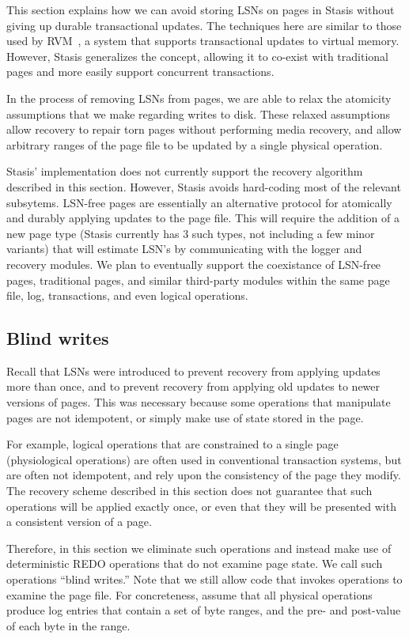 \documentclass[letterpaper,twocolumn,10pt]{article}
\newcommand{\yad}{Stasis\xspace}
\newcommand{\yads}{Stasis'\xspace}
\begin{document}
This section explains how we can avoid storing LSNs on pages in \yad
without giving up durable transactional updates.  The techniques here
are similar to those used by RVM~\cite{lrvm}, a system that supports
transactional updates to virtual memory.  However, \yad generalizes
the concept, allowing it to co-exist with traditional pages and more easily
support concurrent transactions.

In the process of removing LSNs from pages, we
are able to relax the atomicity assumptions that we make regarding
writes to disk.  These relaxed assumptions allow recovery to repair
torn pages without performing media recovery, and allow arbitrary
ranges of the page file to be updated by a single physical operation.

\yads implementation does not currently support the recovery algorithm
described in this section.  However, \yad avoids hard-coding most of
the relevant subsytems.  LSN-free pages are essentially an alternative
protocol for atomically and durably applying updates to the page file.
This will require the addition of a new page type (\yad currently has
3 such types, not including a few minor variants) that will estimate 
LSN's by communicating with the logger and recovery modules.  We plan
to eventually support the coexistance of LSN-free pages, traditional
pages, and similar third-party modules within the same page file, log,
transactions, and even logical operations.

\subsection{Blind writes}
Recall that LSNs were introduced to prevent recovery from applying
updates more than once, and to prevent recovery from applying old
updates to newer versions of pages.  This was necessary because some
operations that manipulate pages are not idempotent, or simply make
use of state stored in the page.  

For example, logical operations that are constrained to a single page
(physiological operations) are often used in conventional transaction
systems, but are often not idempotent, and rely upon the consistency
of the page they modify.  The recovery scheme described in this
section does not guarantee that such operations will be applied
exactly once, or even that they will be presented with a consistent
version of a page.

Therefore, in this section we eliminate such operations and instead
make use of deterministic REDO operations that do not examine page
state.  We call such operations ``blind writes.''  Note that we still
allow code that invokes operations to examine the page file.  For concreteness,
assume that all physical operations produce log entries that contain a
set of byte ranges, and the pre- and post-value of each byte in the
range.  
\end{document}
